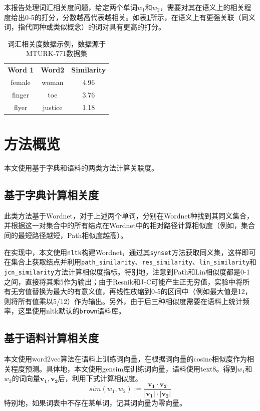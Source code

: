 \documentclass{article}
\begin{document}
本报告处理词汇相关度问题，给定两个单词$w_1$和$w_2$，需要对其在语义上的相关程度给出0-5的打分，分数越高代表越相关。如表\ref{tab:dataset_eg}所示，在语义上有更强关联（同义词，指代同种或类似概念）的词对具有更高的打分。

\begin{table}[h]
  \centering
  \begin{tabular}{c c c}
    \toprule
    \bfseries Word 1 & \bfseries Word2 & \bfseries Similarity \\
    \cmidrule(lr){1-3}
    female & woman & 4.96 \\
    finger & toe & 3.76 \\
    flyer & justice & 1.18\\
    \bottomrule
  \end{tabular}
  \caption{词汇相关度数据示例，数据源于MTURK-771数据集}
  \label{tab:dataset_eg}
\end{table}

\section{方法概览}
本文使用基于字典和语料的两类方法计算关联度。
\subsection{基于字典计算相关度}
此类方法基于Wordnet，对于上述两个单词，分别在Wordnet种找到其同义集合，并根据这一对集合中的所有结点在Wordnet中的相对路径计算相似度（例如，集合间的最短路径越短，Path相似度越高）。

在实现中，本文使用\texttt{nltk}构建Wordnet，通过其\texttt{synset}方法获取同义集，这样即可在集合上获取结点并利用\texttt{path\_similarity}、\texttt{res\_similarity}、\texttt{lin\_similarity}和\texttt{jcn\_similarity}方法计算相似度指标。特别地，注意到Path和Lin相似度都是0-1之间，直接将其乘5作为输出；由于Resnik和J-C可能产生正无穷值，实验中将所有无穷值替换为最大的有意义值，再线性放缩到0-5的区间中（例如最大值是12，则将所有值乘以5/12）作为输出。另外，由于后三种相似度需要在语料上统计频率，这里使用nltk默认的\texttt{brown}语料库。

\subsection{基于语料计算相关度}
本文使用word2vec算法在语料上训练词向量，在根据词向量的cosine相似度作为相关程度预测。具体地，本文使用gensim库训练词向量，语料使用text8。得到$w_1$和$w_2$的词向量$\mathbf{v_1}, \mathbf{v_2}$后，利用下式计算相似度。
\[ sim(w_1, w_2) := \frac{\mathbf{v_1}\cdot \mathbf{v_2}}{|\mathbf{v_1}|\cdot |\mathbf{v_2}|} \]
特别地，如果词表中不存在某单词，记其词向量为零向量。
\end{document}
